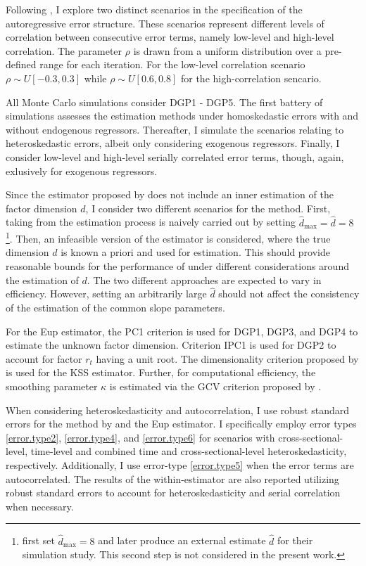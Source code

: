 Following \citet{bada2014parameter}, I explore two distinct scenarios in the specification of the autoregressive error structure. These scenarios represent different levels of correlation between consecutive error terms, namely low-level and high-level correlation.  The parameter $\rho$ is drawn from a uniform distribution over a pre-defined range for each iteration. For the low-level correlation scenario $\rho \sim U[-0.3, 0.3]$ while $\rho \sim U[0.6, 0.8]$ for the high-correlation sencario. 

All Monte Carlo simulations consider \ac{DGP}1 - \ac{DGP}5. The first battery of simulations assesses the estimation methods under homoskedastic errors with and without endogenous regressors. Thereafter, I simulate the scenarios relating to heteroskedastic errors, albeit only considering exogenous regressors. Finally, I consider low-level and high-level serially correlated error terms, though, again, exlusively for exogenous regressors. 


Since the estimator proposed by \citet{bai2009panel} does not include an inner estimation of the factor dimension $d$, I consider two different scenarios for the method. First, taking from \citet{bada2014parameter} the estimation process is naively carried out by setting $\hat{d}_{\text{max}} = \hat{d} = 8$ \footnote{\citet{bada2014parameter} first set $\hat{d}_{\text{max}} = 8$ and later produce an external estimate $\hat{d}$ for their simulation study. This second step is not considered in the present work.}. Then, an infeasible version of the estimator is considered, where the true dimension $d$ is known a priori and used for estimation. This should provide reasonable bounds for the performance of \citet{bai2009panel} under different considerations around the estimation of $d$. The two different approaches are expected to vary in efficiency. However, setting an arbitrarily large $\hat{d}$ should not affect the consistency of the estimation of the common slope parameters. 

For the \ac{Eup} estimator, the PC1 criterion is used for \ac{DGP}1, \ac{DGP}3, and \ac{DGP}4 to estimate the unknown factor dimension. Criterion IPC1 is used for \ac{DGP}2 to account for factor $r_t$ having a unit root. The dimensionality criterion proposed by \citet{kneip2012new} is used for the \ac{KSS} estimator. Further, for computational efficiency,  the smoothing parameter $\kappa$ is estimated via the \ac{GCV} criterion proposed by \citet{bada2012phtt}. 

When considering heteroskedasticity and autocorrelation, I use robust standard errors for the method by \citet{bai2009panel} and the \ac{Eup} estimator. I specifically employ error types \ref{error.type2}, \ref{error.type4}, and \ref{error.type6} for scenarios with cross-sectional-level, time-level and combined time and cross-sectional-level heteroskedasticity, respectively. Additionally, I use error-type \ref{error.type5} when the error terms are autocorrelated. The results of the within-estimator are also reported utilizing robust standard errors to account for heteroskedasticity and serial correlation when necessary. 


